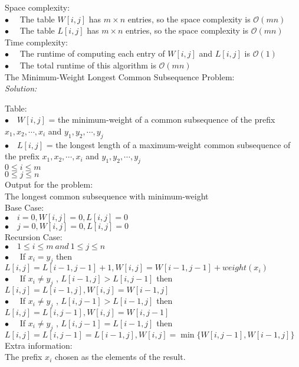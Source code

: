 \documentclass[12pt,letterpaper]{article}
\newcommand{\solution}{\textit{Solution:}\par}
\begin{document}
Space complexity: \\
$\bullet \quad$ The table $W[i,j]$ has $m \times n$ entries, so the space complexity is $\mathcal{O}(mn)$ \\
$\bullet \quad$ The table $L[i,j]$ has $m \times n$ entries, so the space complexity is $\mathcal{O}(mn)$ \\
Time complexity: \\
$\bullet \quad$ The runtime of computing each entry of $W[i,j]$ and $L[i,j]$ is $\mathcal{O}(1)$ \\
$\bullet \quad$ The total runtime of this algorithm is $\mathcal{O}(mn)$ \\

The Minimum-Weight Longest Common Subsequence Problem: \\
\solution
Table: \\
$\bullet \quad W[i,j]$ = the minimum-weight of a common subsequence of the prefix $x_1,x_2,\cdots,x_i$ and $y_1,y_2,\cdots,y_j$ \\
$\bullet \quad L[i,j]$ = the longest length of a maximum-weight common subsequence of the prefix $x_1,x_2,\cdots,x_i$ and $y_1,y_2,\cdots,y_j$ \\
$ 0 \le i \le m $ \\
$ 0 \le j \le n $ \\
Output for the problem: \\
The longest common subsequence with minimum-weight \\
Base Case: \\
$\bullet \quad i = 0, W[i,j] = 0, L[i,j] = 0$ \\
$\bullet \quad j = 0, W[i,j] = 0, L[i,j] = 0$ \\
Recursion Case: \\
$\bullet \quad 1 \le i \le m\  and\ 1 \le j \le n$ \\
$\bullet \quad $ If $x_i = y_j $ then $ L[i,j] = L[i-1,j-1] + 1 , W[i,j] = W[i-1,j-1] + weight(x_i)$ \\
$\bullet \quad $ If $x_i \neq y_j $ , $L[i-1,j] > L[i,j-1] $ then $L[i,j] = L[i-1,j], W[i,j] = W[i-1,j]$ \\
$\bullet \quad $ If $x_i \neq y_j $ , $L[i,j-1] > L[i-1,j] $ then $L[i,j] = L[i,j-1], W[i,j] = W[i,j-1]$ \\
$\bullet \quad $ If $x_i \neq y_j $ , $L[i,j-1] = L[i-1,j] $ then $L[i,j] = L[i,j-1] = L[i-1,j], W[i,j] = \min \{ W[i,j-1], W[i-1,j] \}$ \\
Extra information: \\
The prefix $x_i$ chosen as the elements of the result.
\end{document}
